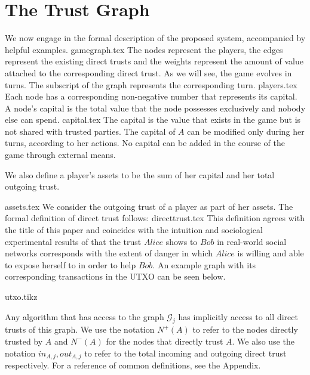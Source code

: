 \section{The Trust Graph}
  We now engage in the formal description of the proposed system, accompanied by helpful examples.
  {gamegraph.tex}
  \noindent The nodes represent the players, the edges represent the existing direct trusts and the weights represent the
  amount of value attached to the corresponding direct trust. As we will see, the game evolves in turns. The subscript of the
  graph represents the corresponding turn.
  {players.tex}
  \noindent Each node has a corresponding non-negative number that represents its capital. A node's capital is the total value
  that the node possesses exclusively and nobody else can spend.
  {capital.tex}
  \noindent The capital is the value that exists in the game but is not shared with trusted parties. The capital of $A$ can be
  modified only during her turns, according to her actions. No capital can be added in the course of the game through external
  means.

  We also define a player's assets to be the sum of her capital and her total outgoing trust.

  {assets.tex}
  \noindent We consider the outgoing trust of a player as part of her assets. The formal definition of direct trust follows:
  {directtrust.tex}
  \noindent This definition agrees with the title of this paper and coincides with the intuition and sociological experimental
  results of \cite{kmrs} that the trust $Alice$ shows to $Bob$ in real-world social networks corresponds with the extent of
  danger in which $Alice$ is willing and able to expose herself to in order to help $Bob$. An example graph with its
  corresponding transactions in the UTXO can be seen below.

  {utxo.tikz}

  \noindent Any algorithm that has access to the graph $\mathcal{G}_j$ has implicitly access to all direct trusts of this
  graph.  We use the notation $N^{+}(A)$ to refer to the nodes directly trusted by $A$ and $N^{-}(A)$ for the nodes that
  directly trust $A$. We also use the notation $in_{A, j}, out_{A, j}$ to refer to the total incoming and outgoing direct
  trust respectively. For a reference of common definitions, see the Appendix.
